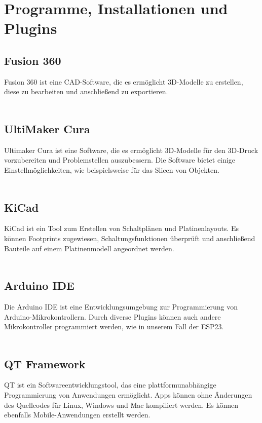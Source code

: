 \documentclass[titlepage,12pt,twoside]{article}
\begin{document}
\newpage
\section{Programme, Installationen und Plugins}
\subsection{Fusion 360}
\label{chap:Fusion 360}
Fusion 360 ist eine CAD-Software, die es ermöglicht 3D-Modelle zu erstellen, diese zu bearbeiten und anschließend zu exportieren. \\
\\
\subsection{UltiMaker Cura}
\label{chap:UltiMaker Cura}
Ultimaker Cura ist eine Software, die es ermöglicht 3D-Modelle für den 3D-Druck vorzubereiten und Problemstellen auszubessern. Die 
Software bietet einige Einstellmöglichkeiten, wie beispielsweise für das Slicen von Objekten. \\
\\
\subsection{KiCad}
\label{chap:KiCad}
KiCad ist ein Tool zum Erstellen von Schaltplänen und Platinenlayouts. Es können Footprints zugewiesen, Schaltungsfunktionen überprüft und anschließend Bauteile auf einem Platinenmodell angeordnet werden. \\
\\
\subsection{Arduino IDE}
\label{chap:Arduino IDE}
Die Arduino IDE ist eine Entwicklungsumgebung zur Programmierung von Arduino-Mikrokontrollern. Durch diverse Plugins können auch andere Mikrokontroller programmiert werden, wie in unserem Fall der ESP23. \\
\\
\subsection{QT Framework}
\label{chap:QT Framework}
QT ist ein Softwareentwicklungstool, das eine plattformunabhängige Programmierung von Anwendungen ermöglicht. Apps können ohne Änderungen des Quellcodes für Linux, Windows und Mac kompiliert werden. Es können ebenfalls Mobile-Anwendungen
erstellt werden. \\
\\
\newpage
\end{document}
